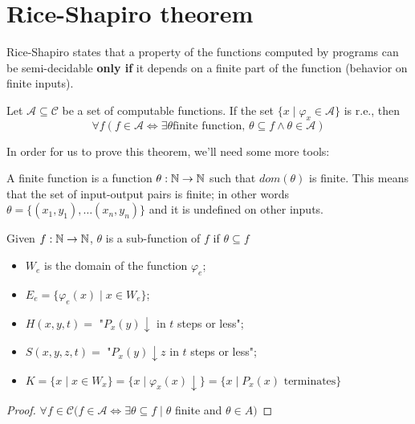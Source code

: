 \chapter {Rice-Shapiro theorem}
Rice-Shapiro states that a property of the functions computed by
programs can be semi-decidable \textbf{only if} it depends on a finite
part of the function (behavior on finite inputs). 
\begin{theorem}
  Let $\mathcal{A} \subseteq \mathcal{C}$ be a set of computable
  functions. If the set $\{x \mid \varphi_x \in \mathcal{A}\}$ is
  r.e., then
  \[
    \forall f (f \in \mathcal{A} \Leftrightarrow \exists \theta \mbox{
      finite function, } \theta \subseteq f \land \theta \in
    \mathcal{A})
  \]

In order for us to prove this theorem, we'll need some more tools:
\begin{definition}
  A finite function is a function $ \theta: \mathbb{N}\rightarrow\mathbb{N} $
  such that $ dom(\theta) $ is finite.  This means that the set of
  input-output pairs is finite; in other words
  $ \theta = \{(x_1,y_1),\dots(x_n,y_n) \} $ and it is undefined on other inputs.
\end{definition}

\begin{definition}
  Given $ f:\mathbb{N}\rightarrow\mathbb{N} $, $ \theta $ is a sub-function of
$f$ if $ \theta \subseteq f $
\end{definition}


\begin{notation}
  \begin{itemize}
  \item $ W_e $ is the domain of the function $ \varphi_e $;
  \item $ E_e = \{\varphi_e(x) \mid x\in W_e \}$;
  \item $ H(x,y,t) = $ "$ P_x(y)\downarrow $ in $t$ steps or less";
  \item $ S(x,y,z,t) =$ "$ P_x(y)\downarrow z$ in $t$ steps or less";
  \item $ K = \{x \mid x\in W_x \} = \{x\mid \varphi_x(x)\downarrow \} =
    \{x\mid P_x(x) \mbox{ terminates} \}$
  \end{itemize}
\end{notation}

\begin{proof}

  $ \forall f \in \mathcal{C} (f \in \mathcal{A} \Leftrightarrow
  \exists\theta\subseteq f \mid \theta $ finite and $ \theta\in A)$


\end{proof}
\end{theorem}
